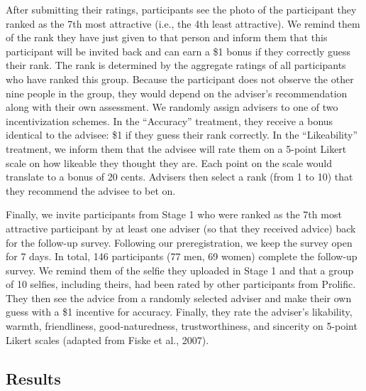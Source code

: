 \documentclass[
  man,
  floatsintext,
  longtable,
  nolmodern,
  notxfonts,
  notimes,
  colorlinks=true,linkcolor=blue,citecolor=blue,urlcolor=blue]{apa7}
\begin{document}
After submitting their ratings, participants see the photo of the
participant they ranked as the 7th most attractive (i.e., the 4th least
attractive). We remind them of the rank they have just given to that
person and inform them that this participant will be invited back and
can earn a \$1 bonus if they correctly guess their rank. The rank is
determined by the aggregate ratings of all participants who have ranked
this group. Because the participant does not observe the other nine
people in the group, they would depend on the adviser's recommendation
along with their own assessment. We randomly assign advisers to one of
two incentivization schemes. In the ``Accuracy'' treatment, they receive
a bonus identical to the advisee: \$1 if they guess their rank
correctly. In the ``Likeability'' treatment, we inform them that the
advisee will rate them on a 5-point Likert scale on how likeable they
thought they are. Each point on the scale would translate to a bonus of
20 cents. Advisers then select a rank (from 1 to 10) that they recommend
the advisee to bet on.

Finally, we invite participants from Stage 1 who were ranked as the 7th
most attractive participant by at least one adviser (so that they
received advice) back for the follow-up survey. Following our
preregistration, we keep the survey open for 7 days. In total, 146
participants (77 men, 69 women) complete the follow-up survey. We remind
them of the selfie they uploaded in Stage 1 and that a group of 10
selfies, including theirs, had been rated by other participants from
Prolific. They then see the advice from a randomly selected adviser and
make their own guess with a \$1 incentive for accuracy. Finally, they
rate the adviser's likability, warmth, friendliness, good-naturedness,
trustworthiness, and sincerity on 5-point Likert scales (adapted from
Fiske et al., 2007).

\subsection{Results}\label{results-1}
\end{document}
